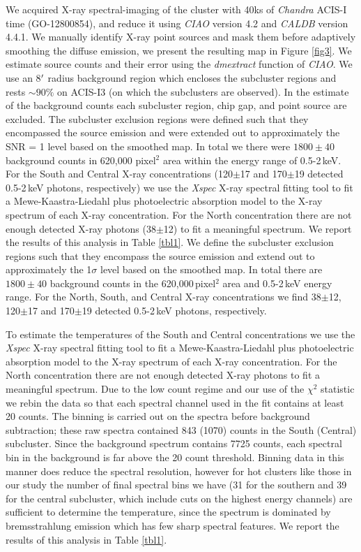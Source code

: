 We acquired X-ray spectral-imaging of the cluster with 40ks of {\it Chandra} ACIS-I time (GO-12800854), and reduce it using \emph{CIAO} version 4.2 and \emph{CALDB} version 4.4.1.
We manually identify X-ray point sources and mask them before adaptively smoothing the diffuse emission, we present the resulting map in Figure \ref{fig3}.
We estimate source counts and their error using the \emph{dmextract} function of \emph{CIAO}.
We use an 8$\mbox{$^\prime$}$ radius background region which encloses the subcluster regions and rests $\sim90\%$ on ACIS-I3 (on which the subclusters are observed).
In the estimate of the background counts each subcluster region, chip gap, and point source are excluded.
The subcluster exclusion regions were defined such that they encompassed the source emission and were extended out to approximately the SNR = 1 level based on the smoothed map.
In total we there were $1800\pm40$ background counts in 620,000 pixel$^2$ area within the energy range of 0.5-2\,keV.
For the South and Central X-ray concentrations (120$\pm$17 and 170$\pm$19 detected 0.5-2\,keV photons, respectively) we use the \emph{Xspec} X-ray spectral fitting tool \citep{Arnaud:1996vl} to fit a Mewe-Kaastra-Liedahl plus photoelectric absorption model \citep[fixed to the Leiden/Argentine/Bonn value;][]{Kalberla:2005de} to the X-ray spectrum of each X-ray concentration.
For the North concentration there are not enough detected X-ray photons (38$\pm$12) to fit a meaningful spectrum.  
We report the results of this analysis in Table \ref{tbl1}. 
We define the subcluster exclusion regions such that they encompass the source emission and extend out to approximately the 1$\sigma$ level based on the smoothed map.  
In total there are $1800\pm40$ background counts in the 620,000\,pixel$^2$ area and 0.5-2\,keV energy range.
For the North, South, and Central X-ray concentrations we find 38$\pm$12, 120$\pm$17 and 170$\pm$19 detected 0.5-2\,keV photons, respectively.   
 
To estimate the temperatures of the South and Central concentrations we use the \emph{Xspec} X-ray spectral fitting tool \citep{Arnaud:1996vl} to fit a Mewe-Kaastra-Liedahl plus photoelectric absorption model \citep[fixed to the Leiden/Argentine/Bonn value;][]{Kalberla:2005de} to the X-ray spectrum of each X-ray concentration.  
For the North concentration there are not enough detected X-ray photons to fit a meaningful spectrum.  
Due to the low count regime and our use of the $\chi^2$ statistic we rebin the data so that each spectral channel used in the fit contains at least 20 counts.
The binning is carried out on the spectra before background subtraction; these raw spectra contained 843 (1070) counts in the South (Central) subcluster.
Since the background spectrum contains 7725 counts, each spectral bin in the background is far above the 20 count threshold.
Binning data in this manner does reduce the spectral resolution, however for hot clusters like those in our study the number of final spectral bins we have (31 for the southern and 39 for the central subcluster, which include cuts on the highest energy channels) are sufficient to determine the temperature, since the spectrum is dominated by bremsstrahlung emission which has few sharp spectral features. 
We report the results of this analysis in Table \ref{tbl1}.

